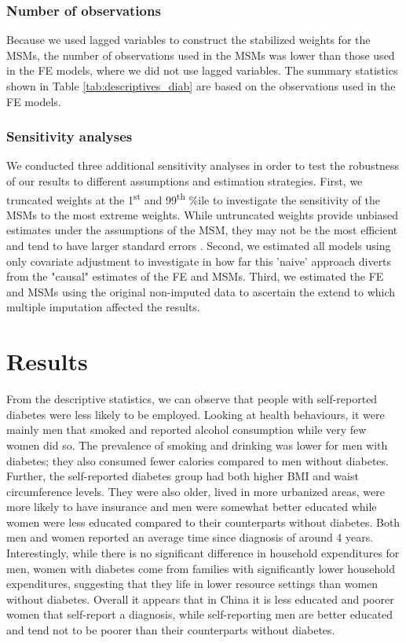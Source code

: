 \subsubsection{Number of observations}

Because we used lagged variables to construct the stabilized weights for the \acp{MSM}, the number of observations used in the \acp{MSM} was lower than those used in the \ac{FE} models, where we did not use lagged variables. The summary statistics shown in Table \ref{tab:descriptives_diab} are based on the observations used in the \ac{FE} models.

\subsubsection*{Sensitivity analyses}

We conducted three additional sensitivity analyses in order to test the robustness of our results to different assumptions and estimation strategies.
First, we truncated weights at the 1\textsuperscript{st} and 99\textsuperscript{th} \%ile to investigate the sensitivity of the \acp{MSM} to the most extreme weights. While untruncated weights provide unbiased estimates under the assumptions of the \ac{MSM}, they may not be the most efficient and tend to have larger standard errors \parencite{Cole2008}. Second, we estimated all models using only covariate adjustment to investigate in how far this 'naive' approach diverts from the "causal" estimates of the \ac{FE} and \acp{MSM}. Third, we estimated the \ac{FE} and \acp{MSM} using the original non-imputed data to ascertain the extend to which multiple imputation affected the results.

\section{\label{sec:Results5}Results}

From the descriptive statistics, we can observe that people with self-reported diabetes were less likely to be employed. Looking at health behaviours, it were mainly men that smoked and reported alcohol consumption while very few women did so. The prevalence of smoking and drinking was lower for men with diabetes; they also consumed fewer calories compared to men without diabetes. Further, the self-reported diabetes group had both higher \ac{BMI} and waist circumference levels. They were also older, lived in more urbanized areas, were more likely to have insurance and men were somewhat better educated while women were less educated compared to their counterparts without diabetes. Both men and women reported an average time since diagnosis of around 4 years. Interestingly, while there is no significant difference in household expenditures for men, women with diabetes come from families with significantly lower household expenditures, suggesting that they life in lower resource settings than women without diabetes. Overall it appears that in China it is less educated and poorer women that self-report a diagnosis, while self-reporting men are better educated and tend not to be poorer than their counterparts without diabetes.


